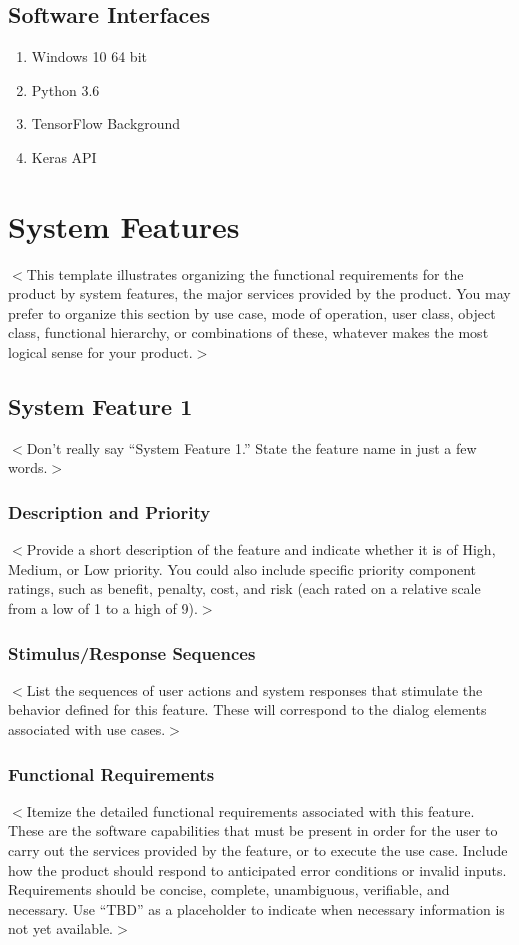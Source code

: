 \documentclass{scrreprt}
\begin{document}
\begin{CJK}{UTF8}{bkai}
\section{Software Interfaces}
\begin{enumerate}
    \item Windows 10 64 bit
    \item Python 3.6
    \item TensorFlow Background
    \item Keras API
\end{enumerate} 

\chapter{System Features}
$<$This template illustrates organizing the functional requirements for the 
product by system features, the major services provided by the product. You may 
prefer to organize this section by use case, mode of operation, user class, 
object class, functional hierarchy, or combinations of these, whatever makes the 
most logical sense for your product.$>$

\section{System Feature 1}
$<$Don’t really say “System Feature 1.” State the feature name in just a few 
words.$>$

\subsection{Description and Priority}
$<$Provide a short description of the feature and indicate whether it is of 
High, Medium, or Low priority. You could also include specific priority 
component ratings, such as benefit, penalty, cost, and risk (each rated on a 
relative scale from a low of 1 to a high of 9).$>$

\subsection{Stimulus/Response Sequences}
$<$List the sequences of user actions and system responses that stimulate the 
behavior defined for this feature. These will correspond to the dialog elements 
associated with use cases.$>$

\subsection{Functional Requirements}
$<$Itemize the detailed functional requirements associated with this feature.  
These are the software capabilities that must be present in order for the user 
to carry out the services provided by the feature, or to execute the use case.  
Include how the product should respond to anticipated error conditions or 
invalid inputs. Requirements should be concise, complete, unambiguous, 
verifiable, and necessary. Use “TBD” as a placeholder to indicate when necessary 
information is not yet available.$>$


\end{CJK}
\end{document}
